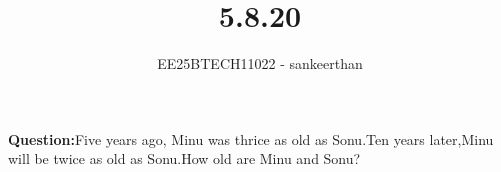 \documentclass[journal]{IEEEtran}
\begin{document}


\title{5.8.20}
\author{EE25BTECH11022 - sankeerthan}
{\let\newpage\relax\maketitle}

\renewcommand{\thefigure}{\theenumi}
\renewcommand{\thetable}{\theenumi}
\setlength{\intextsep}{10pt} %


\renewcommand{\thetable}{\theenumi}

\textbf{Question:}Five years ago, Minu was thrice as old as Sonu.Ten years later,Minu will be twice as old as Sonu.How old are Minu and Sonu?
\end{document}
